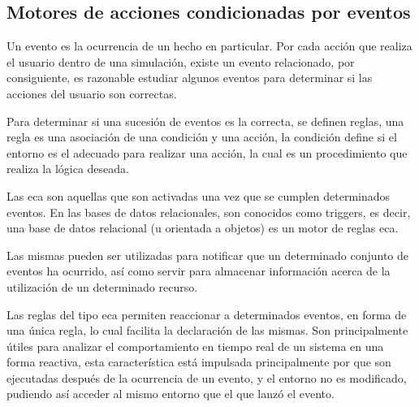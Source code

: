 

\subsection{Motores de acciones condicionadas por eventos}
\label{sec:eca}

Un evento es la ocurrencia de un hecho en particular. Por cada acción que
realiza el usuario dentro  de una simulación, existe un evento relacionado, por
consiguiente, es razonable  estudiar algunos eventos para determinar si las
acciones del usuario son correctas.

Para determinar si una sucesión de eventos es la correcta, se definen reglas,
una regla es una asociación de una condición y una acción, la condición define
si el entorno es el adecuado para realizar una acción, la cual es un
procedimiento que realiza la lógica deseada.

Las \gls{eca} son aquellas que son activadas una vez que se cumplen determinados
eventos\cite{bailey2004event}. En las bases de datos relacionales, son conocidos
como triggers, es decir, una base de datos relacional (u orientada a objetos) es
un motor de reglas \gls{eca}\cite{bailey2004event,behrends2006combining}.

Las mismas pueden ser utilizadas para notificar que un determinado conjunto de
eventos ha ocurrido\cite{bailey2004event}, así como servir para almacenar
información acerca de la utilización de un determinado recurso.



Las reglas del tipo \gls{eca} permiten reaccionar a determinados eventos, en
forma de una única regla, lo cual facilita la declaración de las
mismas\cite{bailey2004event}.  Son principalmente útiles para analizar el
comportamiento en tiempo real de un sistema en una forma
reactiva\cite{bailey2004event,de2001eca,bailey2002analysis},  esta
característica está impulsada principalmente por que son ejecutadas después  de
la ocurrencia de un evento, y el entorno no es modificado, pudiendo así acceder
al mismo entorno que el que lanzó el evento.


